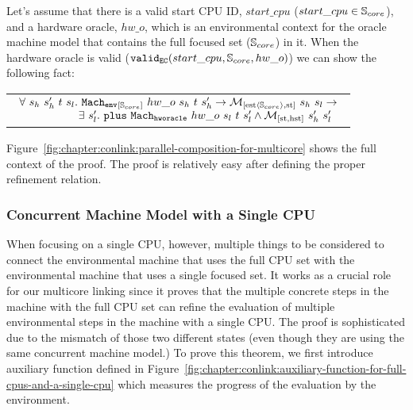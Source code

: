 \begin{lemma}
\label{lemma:chapter:conlink:mc-oracle-env}
Let's assume that there is a valid start CPU ID,
$start\_cpu$ ($start\_cpu \in {\mathbb{S}_{core}}$), and a hardware oracle, $hw\_o$,  
which is an environmental context for the oracle machine model that contains the full focused set (${\mathbb{S}_{core}}$) in it.
When the hardware oracle is valid (${{\mathrm{\texttt{valid}}}_{{\mathrm{\texttt{EC}}}}}({start\_cpu}, {{\mathbb{S}_{core}}}, {hw\_o})$) we can show the following fact:
\begin{center}
\begin{tabular}{P{0.95\textwidth}}
$
\begin{array}{l}
\forall \ s_h \ s_h' \ t \ s_l . \ {{{{\mathrm{\texttt{Mach}}}}_{{\mathrm{\texttt{env}}}}}_{[{{\mathbb{S}_{core}}}]}~{hw\_o }~{s_h}~{t}~{s_h'}} \rightarrow  {{\mathcal{M}_{[\mathrm{est}\langle{\mathbb{S}_{core}}\rangle,\mathrm{st}]}}~{s_h}~{s_l}} \rightarrow \\
\ \ \ \ \ \ \ \ \ \ \ \ \ \ \ \ \exists\ s_l' . \  {{{\mathrm{\texttt{plus}}}}~{{{{{{\mathrm{\texttt{Mach}}}}_{{\mathrm{\texttt{hworacle}}}}}}~{hw\_o }~{s_l}~{t}~{s_l'}}}} \wedge  {{\mathcal{M}_{[\mathrm{st},\mathrm{hst}]}}~{s_h'}~{s_l'}}\\
\end{array}
$\\
\end{tabular}
\end{center}
\end{lemma}

Figure~\ref{fig:chapter:conlink:parallel-composition-for-multicore} shows the full context of the proof. 
The proof is relatively easy after defining the proper refinement relation. 

\subsubsection{Concurrent Machine Model with a Single CPU}


When focusing on a single CPU, however, 
multiple things to be considered to connect the environmental machine that uses the full CPU set  
with the environmental machine that uses a single focused set.
It works as a crucial role 
for our multicore linking since it proves that the multiple concrete steps  in the machine with the full CPU set can
 refine the evaluation of multiple environmental steps in the machine with a single CPU.
The proof is sophisticated due to the mismatch of those two different states (even though they are 
using the same concurrent machine model.)
To prove this theorem, 
we first introduce auxiliary function defined in Figure~\ref{fig:chapter:conlink:auxiliary-function-for-full-cpus-and-a-single-cpu}
which measures the progress of the evaluation by the environment. 

